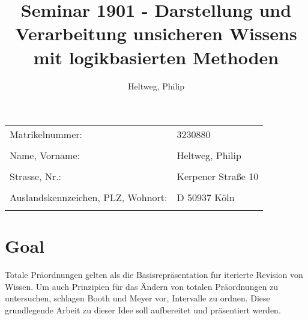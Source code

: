\documentclass[11pt]{article}
\begin{document}
\title{Seminar 1901 - Darstellung und Verarbeitung unsicheren Wissens mit logikbasierten Methoden}
\author{
	Heltweg, Philip
}
\maketitle

\begin{tabular}{l l}
Matrikelnummer: & 3230880\\
\\
Name, Vorname: & Heltweg, Philip\\
\\
Strasse, Nr.: & Kerpener Straße 10\\
\\
Auslandskennzeichen, PLZ, Wohnort: & D 50937 Köln\\
\\
\end{tabular}

\newpage

\section{Goal}
Totale Präordnungen gelten als die Basisrepräsentation fur iterierte Revision von Wissen. Um auch Prinzipien für das Ändern von totalen Präordnungen zu untersuchen, schlagen Booth und Meyer vor, Intervalle zu ordnen. Diese grundlegende Arbeit zu dieser Idee soll aufbereitet und präsentiert werden.
\end{document}
